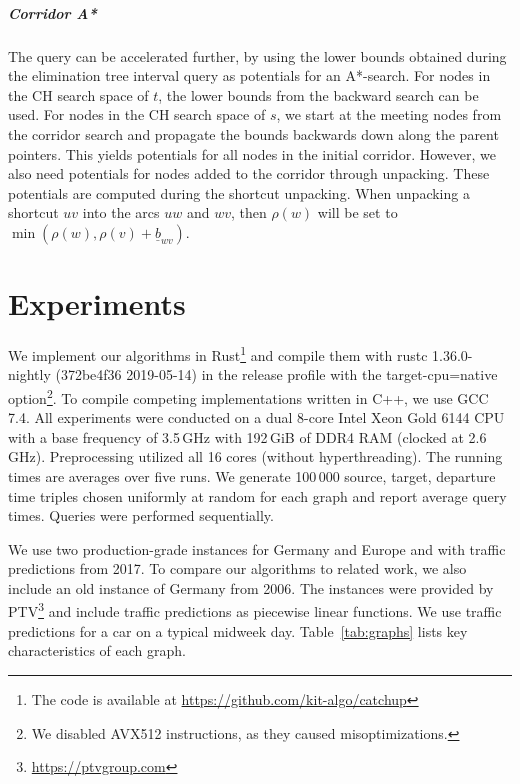 \documentclass[a4paper,UKenglish,cleveref,autoref]{lipics-v2019}
\begin{document}
\subparagraph*{Corridor A*}

The query can be accelerated further, by using the lower bounds obtained during the elimination tree interval query as potentials for an A*-search.
For nodes in the CH search space of $t$, the lower bounds from the backward search can be used.
For nodes in the CH search space of $s$, we start at the meeting nodes from the corridor search and propagate the bounds backwards down along the parent pointers.
This yields potentials for all nodes in the initial corridor.
However, we also need potentials for nodes added to the corridor through unpacking.
These potentials are computed during the shortcut unpacking.
When unpacking a shortcut $u v$ into the arcs $u w$ and $w v$, then $\rho(w)$ will be set to $\min(\rho(w), \rho(v) + \underline{b}_{w v})$.

\section{Experiments}\label{sec:exp}

We implement our algorithms in Rust\footnote{The code is available at \url{https://github.com/kit-algo/catchup}} and compile them with rustc 1.36.0-nightly (372be4f36 2019-05-14) in the release profile with the target-cpu=native option\footnote{We disabled AVX512 instructions, as they caused misoptimizations.}.
To compile competing implementations written in C++, we use GCC 7.4.
All experiments were conducted on a dual 8-core Intel Xeon Gold 6144 CPU with a base frequency of 3.5\,GHz with 192\,GiB of DDR4 RAM (clocked at 2.6\,GHz).
Preprocessing utilized all 16 cores (without hyperthreading).
The running times are averages over five runs.
We generate 100\,000 source, target, departure time triples chosen uniformly at random for each graph and report average query times.
Queries were performed sequentially.

We use two production-grade instances for Germany and Europe and with traffic predictions from 2017.
To compare our algorithms to related work, we also include an old instance of Germany from 2006.
The instances were provided by PTV\footnote{\url{https://ptvgroup.com}} and include traffic predictions as piecewise linear functions.
We use traffic predictions for a car on a typical midweek day.
Table~\ref{tab:graphs} lists key characteristics of each graph.
\end{document}
